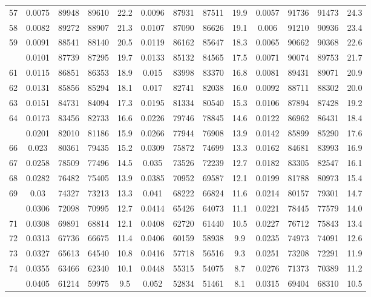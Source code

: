 \documentclass[
  14pt,
]{article}
\begin{document}
\begin{longtable}[t]{lcccccccccccc}
57 & 0.0075 & 89948 & 89610 & 22.2 & 0.0096 & 87931 & 87511 & 19.9 & 0.0057 & 91736 & 91473 & 24.3\\
58 & 0.0082 & 89272 & 88907 & 21.3 & 0.0107 & 87090 & 86626 & 19.1 & 0.006 & 91210 & 90936 & 23.4\\
59 & 0.0091 & 88541 & 88140 & 20.5 & 0.0119 & 86162 & 85647 & 18.3 & 0.0065 & 90662 & 90368 & 22.6\\
\addlinespace
60 & 0.0101 & 87739 & 87295 & 19.7 & 0.0133 & 85132 & 84565 & 17.5 & 0.0071 & 90074 & 89753 & 21.7\\
61 & 0.0115 & 86851 & 86353 & 18.9 & 0.015 & 83998 & 83370 & 16.8 & 0.0081 & 89431 & 89071 & 20.9\\
62 & 0.0131 & 85856 & 85294 & 18.1 & 0.017 & 82741 & 82038 & 16.0 & 0.0092 & 88711 & 88302 & 20.0\\
63 & 0.0151 & 84731 & 84094 & 17.3 & 0.0195 & 81334 & 80540 & 15.3 & 0.0106 & 87894 & 87428 & 19.2\\
64 & 0.0173 & 83456 & 82733 & 16.6 & 0.0226 & 79746 & 78845 & 14.6 & 0.0122 & 86962 & 86431 & 18.4\\
\addlinespace
65 & 0.0201 & 82010 & 81186 & 15.9 & 0.0266 & 77944 & 76908 & 13.9 & 0.0142 & 85899 & 85290 & 17.6\\
66 & 0.023 & 80361 & 79435 & 15.2 & 0.0309 & 75872 & 74699 & 13.3 & 0.0162 & 84681 & 83993 & 16.9\\
67 & 0.0258 & 78509 & 77496 & 14.5 & 0.035 & 73526 & 72239 & 12.7 & 0.0182 & 83305 & 82547 & 16.1\\
68 & 0.0282 & 76482 & 75405 & 13.9 & 0.0385 & 70952 & 69587 & 12.1 & 0.0199 & 81788 & 80973 & 15.4\\
69 & 0.03 & 74327 & 73213 & 13.3 & 0.041 & 68222 & 66824 & 11.6 & 0.0214 & 80157 & 79301 & 14.7\\
\addlinespace
70 & 0.0306 & 72098 & 70995 & 12.7 & 0.0414 & 65426 & 64073 & 11.1 & 0.0221 & 78445 & 77579 & 14.0\\
71 & 0.0308 & 69891 & 68814 & 12.1 & 0.0408 & 62720 & 61440 & 10.5 & 0.0227 & 76712 & 75843 & 13.4\\
72 & 0.0313 & 67736 & 66675 & 11.4 & 0.0406 & 60159 & 58938 & 9.9 & 0.0235 & 74973 & 74091 & 12.6\\
73 & 0.0327 & 65613 & 64540 & 10.8 & 0.0416 & 57718 & 56516 & 9.3 & 0.0251 & 73208 & 72291 & 11.9\\
74 & 0.0355 & 63466 & 62340 & 10.1 & 0.0448 & 55315 & 54075 & 8.7 & 0.0276 & 71373 & 70389 & 11.2\\
\addlinespace
75 & 0.0405 & 61214 & 59975 & 9.5 & 0.052 & 52834 & 51461 & 8.1 & 0.0315 & 69404 & 68310 & 10.5\\

\end{longtable}
\end{document}
